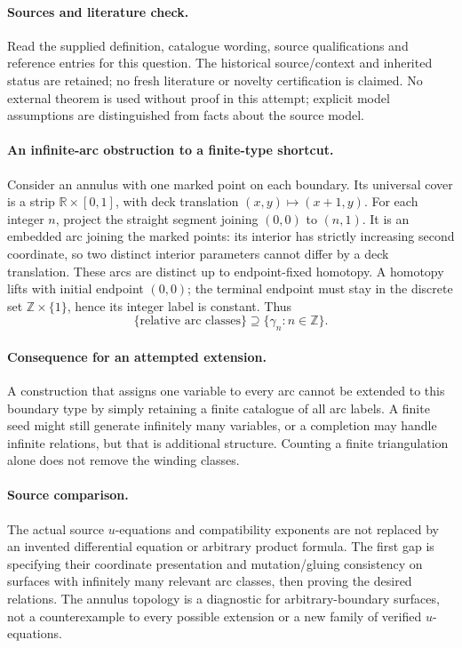 \documentclass[11pt]{article}
\begin{document}
\paragraph{Sources and literature check.}
Read the supplied definition, catalogue wording, source qualifications and reference entries for this question. The historical source/context and inherited status are retained; no fresh literature or novelty certification is claimed. No external theorem is used without proof in this attempt; explicit model assumptions are distinguished from facts about the source model.

\paragraph{An infinite-arc obstruction to a finite-type shortcut.} Consider an annulus with one marked point on each boundary. Its universal cover is a strip \(\mathbb R\times[0,1]\), with deck translation \((x,y)\mapsto(x+1,y)\). For each integer \(n\), project the straight segment joining \((0,0)\) to \((n,1)\). It is an embedded arc joining the marked points: its interior has strictly increasing second coordinate, so two distinct interior parameters cannot differ by a deck translation.
These arcs are distinct up to endpoint-fixed homotopy. A homotopy lifts with initial endpoint \((0,0)\); the terminal endpoint must stay in the discrete set \(\mathbb Z\times\{1\}\), hence its integer label is constant. Thus
\[
 \{\text{relative arc classes}\}\supseteq\{\gamma_n:n\in\mathbb Z\}.
\]
\paragraph{Consequence for an attempted extension.} A construction that assigns one variable to every arc cannot be extended to this boundary type by simply retaining a finite catalogue of all arc labels. A finite seed might still generate infinitely many variables, or a completion may handle infinite relations, but that is additional structure. Counting a finite triangulation alone does not remove the winding classes.
\paragraph{Source comparison.} The actual source \(u\)-equations and compatibility exponents are not replaced by an invented differential equation or arbitrary product formula. The first gap is specifying their coordinate presentation and mutation/gluing consistency on surfaces with infinitely many relevant arc classes, then proving the desired relations. The annulus topology is a diagnostic for arbitrary-boundary surfaces, not a counterexample to every possible extension or a new family of verified \(u\)-equations.
\end{document}
